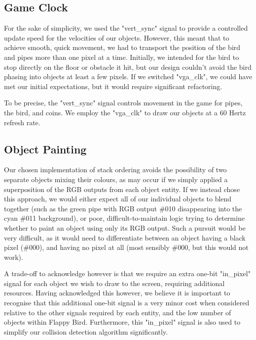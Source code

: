 \documentclass[conference]{IEEEtran}
\begin{document}
\subsection{Game Clock}
For the sake of simplicity, we used the "vert\_sync" signal to provide a controlled update speed for the velocities of our objects. However, this meant that to achieve smooth, quick movement, we had to transport the position of the bird and pipes more than one pixel at a time. Initially, we intended for the bird to stop directly on the floor or obstacle it hit, but our design couldn't avoid the bird phasing into objects at least a few pixels. If we switched "vga\_clk", we could have met our initial expectations, but it would require significant refactoring.

To be precise, the "vert\_sync" signal controls movement in the game for pipes, the bird, and coins. We employ the "vga\_clk" to draw our objects at a 60 Hertz refresh rate.

\subsection{Object Painting}
Our chosen implementation of stack ordering avoids the possibility of two separate objects mixing their colours, as may occur if we simply applied a superposition of the RGB outputs from each object entity. If we instead chose this approach, we would either expect all of our individual objects to blend together (such as the green pipe with RGB output \#010 disappearing into the cyan \#011 background), or poor, difficult-to-maintain logic trying to determine whether to paint an object using only its RGB output. Such a pursuit would be very difficult, as it would need to differentiate between an object having a black pixel (\#000), and having no pixel at all (most sensibly \#000, but this would not work).

A trade-off to acknowledge however is that we require an extra one-bit "in\_pixel" signal for each object we wish to draw to the screen, requiring additional resources. Having acknowledged this however, we believe it is important to recognise that this additional one-bit signal is a very minor cost when considered relative to the other signals required by each entity, and the low number of objects within Flappy Bird. Furthermore, this "in\_pixel" signal is also used to simplify our collision detection algorithm significantly.
\end{document}
